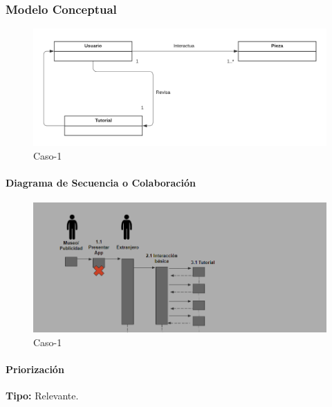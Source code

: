 \subsubsection{Modelo Conceptual}

\begin{figure}[H]
\centerline{\includegraphics[width=15cm]{imgs/ModeloConceptualCaso_2_3.png}}
\caption{Caso-1}
\label{fig}
\end{figure}

\paragraph{Diagrama de Secuencia o Colaboración}

\begin{figure}[H]
\centerline{\includegraphics[width=15cm]{imgs/CasoUso_2_2.PNG}}
\caption{Caso-1}
\label{fig}
\end{figure}

\paragraph{Priorización}
{\textbf {Tipo:}}
Relevante.
